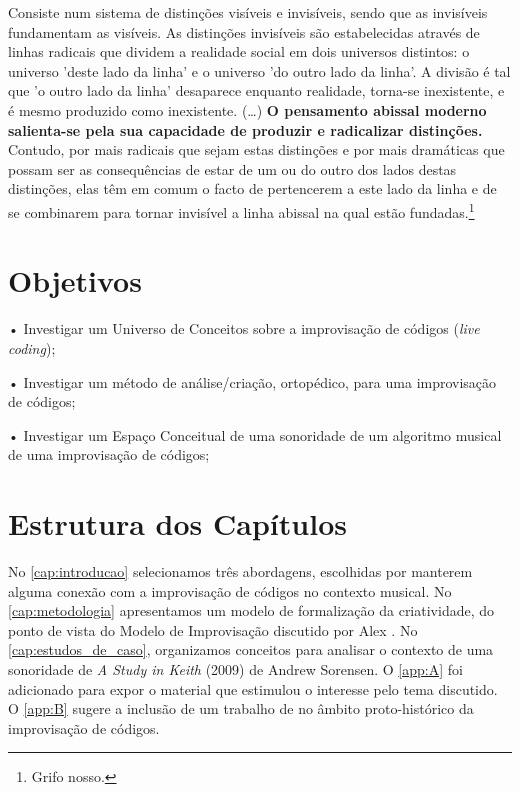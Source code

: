 \begin{citacao}
Consiste num sistema de distinções visíveis e invisíveis, sendo que as invisíveis fundamentam as visíveis. As distinções invisíveis são estabelecidas através de linhas radicais que dividem a realidade social em dois universos distintos: o universo  'deste lado da linha' e o universo 'do outro lado da linha'. A divisão é tal que 'o outro lado da linha' desaparece enquanto realidade, torna-se inexistente, e é mesmo produzido como inexistente. (\ldots) \textbf{O pensamento abissal moderno salienta-se pela sua capacidade de produzir e radicalizar distinções.} Contudo, por mais radicais que sejam estas distinções e por mais dramáticas que possam ser as consequências de estar de um ou do outro dos lados destas distinções, elas têm em comum o facto de pertencerem a este lado da linha e de se combinarem para tornar invisível a linha abissal na qual estão fundadas.\footnote{Grifo nosso.} 
\end{citacao}

\section*{Objetivos}\label{sec:objetivos}

• Investigar um Universo de Conceitos sobre a improvisação de códigos (\emph{live coding});

• Investigar um método de análise/criação, ortopédico, para uma improvisação de códigos;

• Investigar um Espaço Conceitual de uma sonoridade de um algoritmo musical de uma improvisação de códigos;

\section*{Estrutura dos Capítulos}

No \autoref{cap:introducao} selecionamos três abordagens, escolhidas por manterem alguma conexão com a improvisação de códigos no contexto musical.  No \autoref{cap:metodologia} apresentamos um modelo de formalização da criatividade, do ponto de vista do Modelo de Improvisação discutido por Alex . No \autoref{cap:estudos_de_caso}, organizamos conceitos para analisar o contexto de uma sonoridade  de \emph{A Study in Keith} (2009) de Andrew Sorensen.  O \autoref{app:A} foi adicionado para expor o material que estimulou o interesse pelo tema discutido. O \autoref{app:B} sugere a inclusão de um trabalho de  no âmbito proto-histórico da improvisação de códigos.